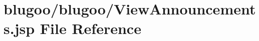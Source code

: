 \hypertarget{ViewAnnouncements_8jsp}{
\section{blugoo/blugoo/ViewAnnouncements.jsp File Reference}
\label{ViewAnnouncements_8jsp}
}


